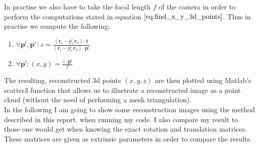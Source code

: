 \documentclass{paper}
\begin{document}
In practise we also have to take the focal length $f$ of the camera in order to perform the computations stated in equation $\ref{eq:find_x_y_3d_points}$. Thus in practise we compute the following:

\begin{enumerate}
    \item $\forall \textbf{p}^{l}, \textbf{p}^{r}: z = \frac{ (\mathbf{r}_{1} - p^{r}_{x} \, \mathbf{r}_{3}) \cdot \mathbf{t} }{ (\mathbf{r}_{1} - p^{r}_{x} \, \mathbf{r}_{3}) \cdot \textbf{p}^{l} }$
    \item $\forall \textbf{p}^{l}: (x,y) = \frac{z \cdot \textbf{p}^{l}}{f}$
\end{enumerate}

The resulting, reconstructed 3d points $(x,y,z)$ are then plotted using Matlab's scatter3 function that allows us to illustrate a reconstructed image as a point cloud (without the need of performing a mesh triangulation). \\

In the following I am going to show some reconstruction images using the method described in this report, when running my code. I also compare my result to those one would get when knowing the exact rotation and translation matrices. These matrices are given as extrinsic parameters in order to compare the results.

     
\end{document}
